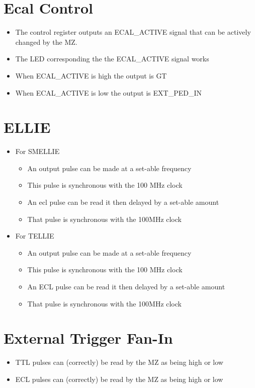 \documentclass[11pt,a4paper]{article}
\begin{document}
\section{Ecal Control}
\begin{itemize}
\item The control register outputs an ECAL\_ACTIVE signal that can be actively
changed by the MZ.
\item The LED corresponding the the ECAL\_ACTIVE signal works
\item When ECAL\_ACTIVE is high the output is GT
\item When ECAL\_ACTIVE is low the output is EXT\_PED\_IN
\end{itemize}
\section{ELLIE}
\begin{itemize}
\item For SMELLIE
	\begin{itemize}
	\item An output pulse can be made at a set-able frequency
	\item This pulse is synchronous with the 100 MHz clock 
	\item An ecl pulse can be read it then delayed by a set-able amount
	\item That pulse is synchronous with the 100MHz clock
	\end{itemize}
	\item For TELLIE
	\begin{itemize}
	\item An output pulse can be made at a set-able frequency
	\item This pulse is synchronous with the 100 MHz clock 
	\item An ECL pulse can be read it then delayed by a set-able amount
	\item That pulse is synchronous with the 100MHz clock
	\end{itemize}
	 
\end{itemize}
\section{External Trigger Fan-In}
\begin{itemize}
\item TTL pulses can (correctly) be read by the MZ as being high or low
\item ECL pulses can (correctly) be read by the MZ as being high or low
\end{itemize}
 
\end{document}

